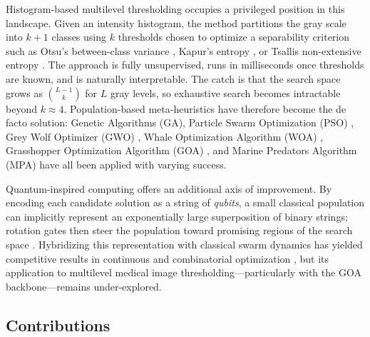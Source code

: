 Histogram-based multilevel thresholding occupies a privileged position in this landscape. Given an intensity histogram, the method partitions the gray scale into $k{+}1$ classes using $k$ thresholds chosen to optimize a separability criterion such as Otsu's between-class variance \cite{otsu1979}, Kapur's entropy \cite{kapur1985}, or Tsallis non-extensive entropy \cite{tsallis2009,deAlbuquerque2004}. The approach is fully unsupervised, runs in milliseconds once thresholds are known, and is naturally interpretable. The catch is that the search space grows as $\binom{L-1}{k}$ for $L$ gray levels, so exhaustive search becomes intractable beyond $k{\approx}4$. Population-based meta-heuristics have therefore become the de facto solution: Genetic Algorithms (GA), Particle Swarm Optimization (PSO) \cite{kennedy1995pso}, Grey Wolf Optimizer (GWO) \cite{mirjalili2014gwo}, Whale Optimization Algorithm (WOA) \cite{mirjalili2016woa}, Grasshopper Optimization Algorithm (GOA) \cite{saremi2017goa}, and Marine Predators Algorithm (MPA) \cite{faramarzi2020mpa} have all been applied with varying success.

Quantum-inspired computing offers an additional axis of improvement. By encoding each candidate solution as a string of \emph{qubits}, a small classical population can implicitly represent an exponentially large superposition of binary strings; rotation gates then steer the population toward promising regions of the search space \cite{han2002qiea,gharehchopogh2023survey,talbi2017qiea}. Hybridizing this representation with classical swarm dynamics has yielded competitive results in continuous and combinatorial optimization \cite{wright2017qiea,dey2019quantum}, but its application to multilevel medical image thresholding---particularly with the GOA backbone---remains under-explored.

\subsection{Contributions}

